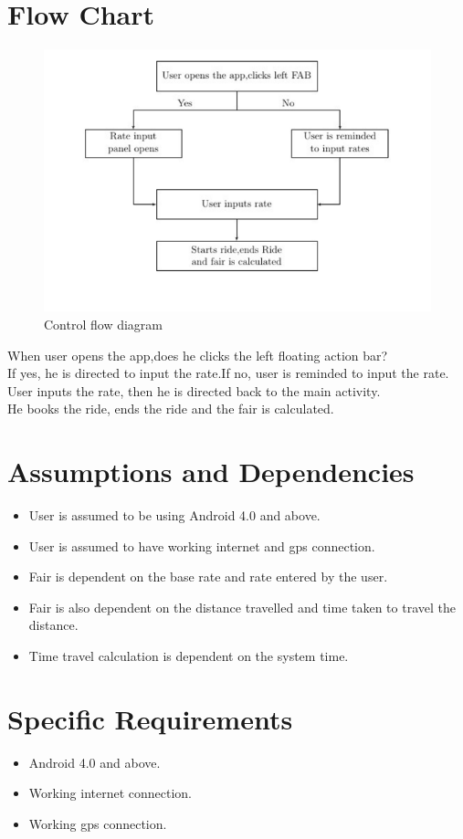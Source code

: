 \section{Flow Chart}
\begin{figure}[h]
\centering
\includegraphics[width=0.75\linewidth]{p01}
\caption{Control flow diagram}
\label{fig:p01}
\end{figure}
When user opens the app,does he clicks the left floating action bar?\\
If yes, he is directed to input the rate.If no, user is reminded to input the rate.\\
User inputs the rate, then he is directed back to the main activity.\\
He books the ride, ends the ride and the fair is calculated.

\section{Assumptions and Dependencies}
\begin{itemize}
	\item User is assumed to be using Android 4.0 and above.
	\item User is assumed to have working internet and gps connection.
	\item Fair is dependent on the base rate and rate entered by the user.
	\item Fair is also dependent on the distance travelled  and time taken to travel the distance. 
	\item Time travel calculation is dependent on the system time.
\end{itemize}
\section{Specific Requirements}
\begin{itemize}
	\item Android 4.0 and above.
	\item Working internet connection.
	\item Working gps connection.
\end{itemize}
